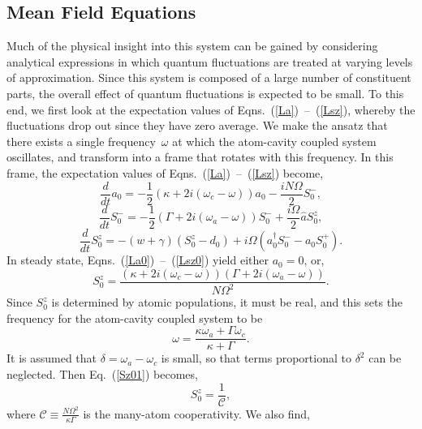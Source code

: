 \documentclass[aps,
twocolumn,
superscriptaddress,groupedaddress]{revtex4}
\begin{document}
\subsection{Mean Field Equations}

Much of the physical insight into this system can be gained by
considering analytical expressions in which quantum fluctuations are
treated at varying levels of approximation. Since this system is
composed of a large number of constituent parts, the overall effect of
quantum fluctuations is expected to be small. To this end, we first
look at the expectation values of Eqns.~(\ref{La})~--~(\ref{Lsz}), whereby
the fluctuations drop out since they have zero average. We make the ansatz that there exists a single frequency~$\omega$ at which the atom-cavity coupled system oscillates, and transform into a frame that rotates with this frequency. In this frame, the expectation values of Eqns.~(\ref{La})~--~(\ref{Lsz}) become,
\begin{equation}
\frac{d}{dt} a_0= -\frac{1}{2} (\kappa +2i(\omega_c-\omega)) a_0
-\frac{i N \Omega}{2} S_0^{-},
\label{La0}
\end{equation}
\begin{equation}
\frac{d}{dt} S_0^{-} =
-\frac{1}{2} \left(\Gamma +2 i (\omega_a-\omega) \right)  S_0^{-}
+\frac{i \Omega}{2} \hat{a} S_0^{z},
\end{equation}
\begin{equation}
\frac{d}{dt} S_0^{z} = -(w+\gamma)\left( S_0^{z} - d_0\right)
+i\Omega \left( a_0^{\dagger} S_0^{-} - a_0 S_0^{+} \right).
\label{Lsz0}
\end{equation}
In steady state, Eqns.~(\ref{La0})~--~(\ref{Lsz0}) yield either
$a_0=0$, or,
\begin{equation}
S_0^{z}=
\frac{(\kappa+2i(\omega_c-\omega))(\Gamma+2i(\omega_a-\omega))}{N\Omega^2}.
\label{Sz01}
\end{equation}
Since $S_0^{z}$ is determined by atomic populations, it must be real,
and this sets the frequency for the atom-cavity coupled system to be
\begin{equation}
\omega = \frac{\kappa \omega_a + \Gamma \omega_c}{\kappa+\Gamma}.
\label{atomcavityfrequencycenter1}
\end{equation}
It is assumed that $\delta = \omega_a-\omega_c$ is small, so that terms
proportional to $\delta^2$ can be neglected. Then Eq.~(\ref{Sz01}) becomes,
\begin{equation}
S_0^{z}=\frac{1}{\mathcal{C}},
\end{equation}
where $\mathcal{C}\equiv \frac{N \Omega^2}{\kappa \Gamma}$ is the many-atom cooperativity. We also find,
\end{document}
